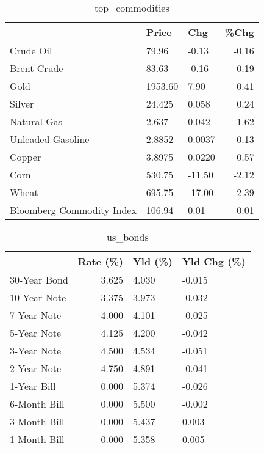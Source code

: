 \documentclass{article}%
\begin{document}
\begin{table}[htbp]%
\caption{top\_commodities}%
\centering%
\begin{adjustbox}{width=1\textwidth}%
\begin{tabular}{lllr}
\toprule
                          &   Price &    Chg &  \%Chg \\
\midrule
               Crude Oil  &   79.96 &  -0.13 & -0.16 \\
             Brent Crude  &   83.63 &  -0.16 & -0.19 \\
                    Gold  & 1953.60 &   7.90 &  0.41 \\
                  Silver  &  24.425 &  0.058 &  0.24 \\
             Natural Gas  &   2.637 &  0.042 &  1.62 \\
       Unleaded Gasoline  &  2.8852 & 0.0037 &  0.13 \\
                  Copper  &  3.8975 & 0.0220 &  0.57 \\
                    Corn  &  530.75 & -11.50 & -2.12 \\
                   Wheat  &  695.75 & -17.00 & -2.39 \\
Bloomberg Commodity Index &  106.94 &   0.01 &  0.01 \\
\bottomrule
\end{tabular}
%
\end{adjustbox}%
\end{table}

%


\begin{table}[htbp]%
\caption{us\_bonds}%
\centering%
\begin{adjustbox}{width=1\textwidth}%
\begin{tabular}{lrll}
\toprule
             &  Rate (\%) & Yld (\%) & Yld Chg (\%) \\
\midrule
30-Year Bond &     3.625 &   4.030 &      -0.015 \\
10-Year Note &     3.375 &   3.973 &      -0.032 \\
 7-Year Note &     4.000 &   4.101 &      -0.025 \\
 5-Year Note &     4.125 &   4.200 &      -0.042 \\
 3-Year Note &     4.500 &   4.534 &      -0.051 \\
 2-Year Note &     4.750 &   4.891 &      -0.041 \\
 1-Year Bill &     0.000 &   5.374 &      -0.026 \\
6-Month Bill &     0.000 &   5.500 &      -0.002 \\
3-Month Bill &     0.000 &   5.437 &       0.003 \\
1-Month Bill &     0.000 &   5.358 &       0.005 \\
\bottomrule
\end{tabular}
%
\end{adjustbox}%
\end{table}
\end{document}
